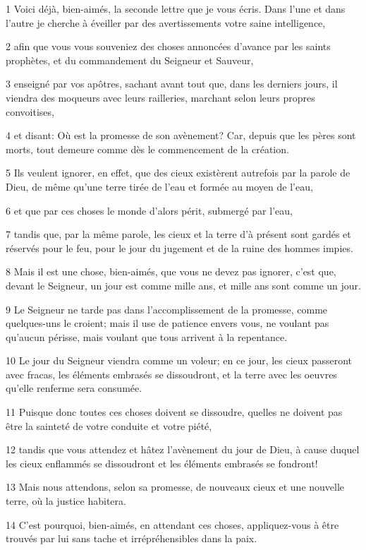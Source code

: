 \par 1 Voici déjà, bien-aimés, la seconde lettre que je vous écris. Dans l'une et dans l'autre je cherche à éveiller par des avertissements votre saine intelligence,
\par 2 afin que vous vous souveniez des choses annoncées d'avance par les saints prophètes, et du commandement du Seigneur et Sauveur,
\par 3 enseigné par vos apôtres, sachant avant tout que, dans les derniers jours, il viendra des moqueurs avec leurs railleries, marchant selon leurs propres convoitises,
\par 4 et disant: Où est la promesse de son avènement? Car, depuis que les pères sont morts, tout demeure comme dès le commencement de la création.
\par 5 Ils veulent ignorer, en effet, que des cieux existèrent autrefois par la parole de Dieu, de même qu'une terre tirée de l'eau et formée au moyen de l'eau,
\par 6 et que par ces choses le monde d'alors périt, submergé par l'eau,
\par 7 tandis que, par la même parole, les cieux et la terre d'à présent sont gardés et réservés pour le feu, pour le jour du jugement et de la ruine des hommes impies.
\par 8 Mais il est une chose, bien-aimés, que vous ne devez pas ignorer, c'est que, devant le Seigneur, un jour est comme mille ans, et mille ans sont comme un jour.
\par 9 Le Seigneur ne tarde pas dans l'accomplissement de la promesse, comme quelques-uns le croient; mais il use de patience envers vous, ne voulant pas qu'aucun périsse, mais voulant que tous arrivent à la repentance.
\par 10 Le jour du Seigneur viendra comme un voleur; en ce jour, les cieux passeront avec fracas, les éléments embrasés se dissoudront, et la terre avec les oeuvres qu'elle renferme sera consumée.
\par 11 Puisque donc toutes ces choses doivent se dissoudre, quelles ne doivent pas être la sainteté de votre conduite et votre piété,
\par 12 tandis que vous attendez et hâtez l'avènement du jour de Dieu, à cause duquel les cieux enflammés se dissoudront et les éléments embrasés se fondront!
\par 13 Mais nous attendons, selon sa promesse, de nouveaux cieux et une nouvelle terre, où la justice habitera.
\par 14 C'est pourquoi, bien-aimés, en attendant ces choses, appliquez-vous à être trouvés par lui sans tache et irrépréhensibles dans la paix.
